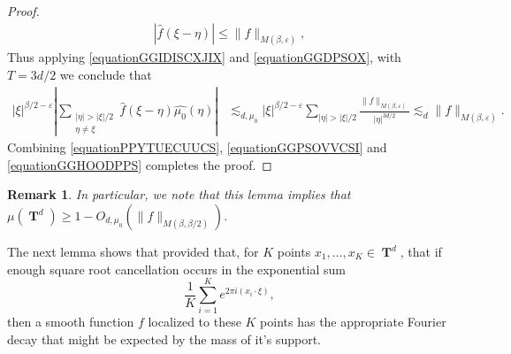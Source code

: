 \documentclass[12pt,reqno]{article}
\numberwithin{equation}{section}
\DeclareMathOperator{\TT}{\mathbf{T}}
\newtheorem{remark}{Remark}
\begin{document}
\begin{proof}
    \begin{equation} \label{equationGGDPSOX}
    \begin{split}
        |\widehat{f}(\xi - \eta)| \leq \| f \|_{M(\beta,\varepsilon)},
    \end{split}
    \end{equation}
    Thus applying \eqref{equationGGIDISCXJIX} and \eqref{equationGGDPSOX}, with $T = 3d/2$ we conclude that
    \begin{equation} \label{equationGGHOODPPS}
    \begin{split}
        |\xi|^{\beta/2 - \varepsilon} \left| \sum_{\substack{|\eta| > |\xi|/2\\ \eta \neq \xi}} \widehat{f}(\xi - \eta) \widehat{\mu_0}(\eta) \right| &\lesssim_{d,\mu_0} |\xi|^{\beta/2 - \varepsilon} \sum_{|\eta| > |\xi|/2} \frac{\| f \|_{M(\beta,\varepsilon)}}{|\eta|^{3d/2}} \lesssim_d \| f \|_{M(\beta,\varepsilon)}.
    \end{split}
    \end{equation}
    Combining \eqref{equationPPYTUECUUCS}, \eqref{equationGGPSOVVCSI} and \eqref{equationGGHOODPPS} completes the proof.
\end{proof}

\begin{remark} \label{remarkFOIJIOSJCIOSJ}
    In particular, we note that this lemma implies that $\mu(\TT^d) \geq 1 - O_{d,\mu_0}(\| f \|_{M(\beta,\beta/2)})$.
\end{remark}

The next lemma shows that provided that, for $K$ points $x_1, \dots, x_K \in \TT^d$, that if enough square root cancellation occurs in the exponential sum
%
\[ \frac{1}{K} \sum_{i = 1}^K e^{2 \pi i (x_i \cdot \xi)}, \]
%
then a smooth function $f$ localized to these $K$ points has the appropriate Fourier decay that might be expected by the mass of it's support.
\end{document}
